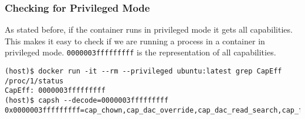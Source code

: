 \subsubsection{Checking for Privileged Mode}

As stated before, if the container runs in privileged mode it gets all capabilities. This makes it easy to check if we are running a process in a container in privileged mode. \lstinline{0000003fffffffff} is the representation of all capabilities.

\begin{lstlisting}
(host)$ docker run -it --rm --privileged ubuntu:latest grep CapEff /proc/1/status
CapEff:	0000003fffffffff
(host)$ capsh --decode=0000003fffffffff 
0x0000003fffffffff=cap_chown,cap_dac_override,cap_dac_read_search,cap_fowner,cap_fsetid,cap_kill,cap_setgid,cap_setuid,cap_setpcap,cap_linux_immutable,cap_net_bind_service,cap_net_broadcast,cap_net_admin,cap_net_raw,cap_ipc_lock,cap_ipc_owner,cap_sys_module,cap_sys_rawio,cap_sys_chroot,cap_sys_ptrace,cap_sys_pacct,cap_sys_admin,cap_sys_boot,cap_sys_nice,cap_sys_resource,cap_sys_time,cap_sys_tty_config,cap_mknod,cap_lease,cap_audit_write,cap_audit_control,cap_setfcap,cap_mac_override,cap_mac_admin,cap_syslog,cap_wake_alarm,cap_block_suspend,cap_audit_read
\end{lstlisting}
